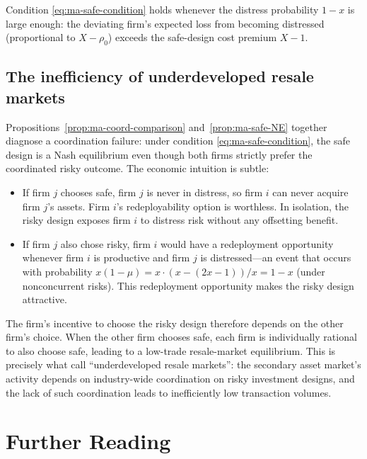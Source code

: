 \documentclass[11pt,a4paper,oneside]{book}
\theoremstyle{plain}
\theoremstyle{definition}
\theoremstyle{remark}
\numberwithin{equation}{chapter}
\begin{document}
Condition \eqref{eq:ma-safe-condition} holds whenever the distress probability $1 - x$ is large enough: the deviating firm's expected loss from becoming distressed (proportional to $X - \rho_0$) exceeds the safe-design cost premium $X - 1$.

\subsection{The inefficiency of underdeveloped resale markets}

Propositions~\ref{prop:ma-coord-comparison} and~\ref{prop:ma-safe-NE} together diagnose a coordination failure: under condition \eqref{eq:ma-safe-condition}, the safe design is a Nash equilibrium even though both firms strictly prefer the coordinated risky outcome.
The economic intuition is subtle:

\begin{itemize}
  \item If firm $j$ chooses safe, firm $j$ is never in distress, so firm $i$ can never acquire firm $j$'s assets.
  Firm $i$'s redeployability option is worthless.
  In isolation, the risky design exposes firm $i$ to distress risk without any offsetting benefit.
  \item If firm $j$ also chose risky, firm $i$ would have a redeployment opportunity whenever firm $i$ is productive and firm $j$ is distressed---an event that occurs with probability $x(1 - \mu) = x \cdot (x - (2x - 1))/x = 1 - x$ (under nonconcurrent risks).
  This redeployment opportunity makes the risky design attractive.
\end{itemize}

The firm's incentive to choose the risky design therefore depends on the other firm's choice.
When the other firm chooses safe, each firm is individually rational to also choose safe, leading to a low-trade resale-market equilibrium.
This is precisely what \citet{ShleiferVishny1992} call ``underdeveloped resale markets'': the secondary asset market's activity depends on industry-wide coordination on risky investment designs, and the lack of such coordination leads to inefficiently low transaction volumes.

\section{Further Reading}
\label{sec:ma-further}
\end{document}
